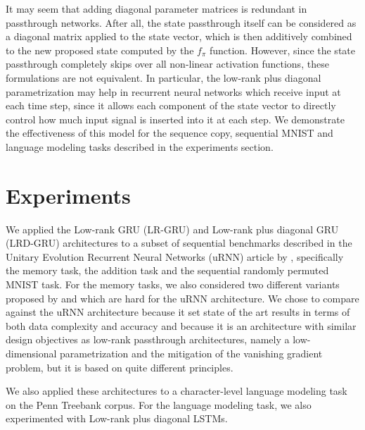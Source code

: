 \documentclass[11pt,a4paper]{article}
\begin{document}
It may seem that adding diagonal parameter matrices is redundant in passthrough networks. After all, the state passthrough itself can be considered as a diagonal matrix applied to the state vector, which is then additively combined to the new proposed state computed by the $f_{\pi}$ function. However, since the state passthrough completely skips over all non-linear activation functions, these formulations are not equivalent. In particular, the low-rank plus diagonal parametrization may help in recurrent neural networks which receive input at each time step, since it allows each component of the state vector to directly control how much input signal is inserted into it at each step. We demonstrate the effectiveness of this model for the sequence copy, sequential MNIST and language modeling tasks described in the experiments section.

\section{Experiments}

We applied the Low-rank GRU (LR-GRU) and Low-rank plus diagonal GRU (LRD-GRU) architectures to a subset of sequential benchmarks described in the Unitary Evolution Recurrent Neural Networks (uRNN) article by , specifically the memory task, the addition task and the sequential randomly permuted MNIST task. For the memory tasks, we also considered two different variants proposed by  and  which are hard for the uRNN architecture. We chose to compare against the uRNN architecture because it set state of the art results in terms of both data complexity and accuracy and because it is an architecture with similar design objectives as low-rank passthrough architectures, namely a low-dimensional parametrization and the mitigation of the vanishing gradient problem, but it is based on quite different principles.

We also applied these architectures to a character-level language modeling task on the Penn Treebank corpus. For the language modeling task, we also experimented with Low-rank plus diagonal LSTMs.
\end{document}
